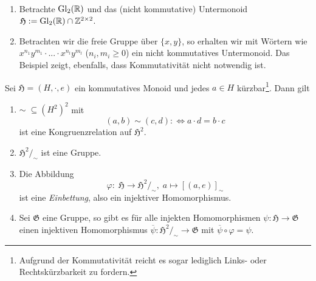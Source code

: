 \begin{example} {\ }
    \begin{enumerate}
        \item Betrachte $\operatorname{Gl}_2(\mathbb{R})$ und das (nicht kommutative) Untermonoid $\mathfrak{H} := \operatorname{Gl}_2(\mathbb{R}) \cap \mathbb{Z}^{2 \times 2}$.
        \item Betrachten wir die freie Gruppe über $\{x,y\}$, so erhalten wir mit Wörtern wie $x^{n_1} y^{m_1} \cdot ... \cdot x^{n_l} y^{m_l}$ ($n_i, m_i \geq 0$)
        ein nicht kommutatives Untermonoid. Das Beispiel zeigt, ebenfalls, dass Kommutativität nicht notwendig ist.
    \end{enumerate}
\end{example}

\begin{theorem}\label{theorem:monoid-gruppe-einbettung}
    Sei $\mathfrak{H} = (H, \cdot, e)$ ein kommutatives Monoid und jedes $a \in H$ kürzbar\footnote{Aufgrund der Kommutativität reicht es sogar lediglich Links- oder Rechtskürzbarkeit zu fordern.}. Dann gilt
    \begin{enumerate}
        \item $\sim\; \subseteq (H^2)^2$ mit
        $$ (a,b) \sim (c,d) :\Leftrightarrow a \cdot d = b \cdot c $$
        ist eine Kongruenzrelation auf $\mathfrak{H}^2$.
        \item $\mathfrak{H}^2 /_\sim$ ist eine Gruppe.
        \item Die Abbildung
        $$ \varphi :\; \mathfrak{H} \to \mathfrak{H}^2 /_\sim, \;a \mapsto [(a,e)]_\sim $$
        ist eine \emph{Einbettung}, also ein injektiver Homomorphismus.
        \item Sei $\mathfrak{G}$ eine Gruppe, so gibt es für alle injekten Homomorphismen $\psi : \mathfrak{H} \to \mathfrak{G}$ einen injektiven Homomorphismus $\overline{\psi} : \mathfrak{H}^2 /_\sim \to \mathfrak{G}$ mit $\overline{\psi} \circ \varphi = \psi$.
    \end{enumerate}

    \begin{figure}[H]
        \centering
\end{figure}
\end{theorem}

